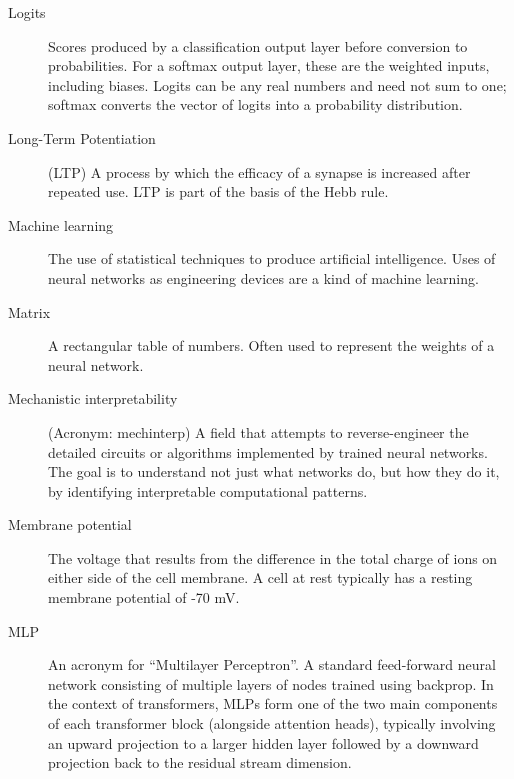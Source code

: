 \begin{description}
\item[Logits] Scores produced by a classification output layer before conversion to probabilities. For a softmax output layer, these are the weighted inputs, including biases. Logits can be any real numbers and need not sum to one; softmax converts the vector of logits into a probability distribution.


\item[Long-Term Potentiation] (LTP) A process by which the efficacy of a synapse is increased after repeated use. LTP is part of the basis of the Hebb rule.

\item[Machine learning] The use of statistical techniques to produce artificial intelligence. Uses of neural networks as engineering devices are a kind of machine learning.

\item[Matrix] A rectangular table of numbers. Often used to represent the weights of a neural network.

\item[Mechanistic interpretability] (Acronym: mechinterp) A field that attempts to reverse-engineer the detailed circuits or algorithms implemented by trained neural networks. The goal is to understand not just what networks do, but how they do it, by identifying interpretable computational patterns.

\item[Membrane potential] The voltage that results from the difference in the total charge of ions on either side of the cell membrane. A cell at rest typically has a resting membrane potential of -70 mV.

\item[MLP]  An acronym for “Multilayer Perceptron”. A standard feed-forward neural network consisting of multiple layers of nodes trained using backprop. In the context of transformers, MLPs form one of the two main components of each transformer block (alongside attention heads), typically involving an upward projection to a larger hidden layer followed by a downward projection back to the residual stream dimension.  




\end{description}
